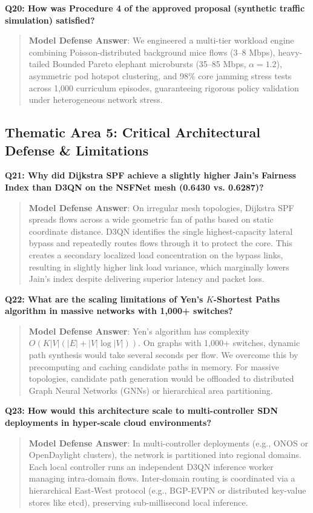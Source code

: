 \noindent\textbf{Q20: How was Procedure 4 of the approved proposal (synthetic traffic simulation) satisfied?}
\begin{quote}
\small
\textbf{Model Defense Answer}: We engineered a multi-tier workload engine combining Poisson-distributed background mice flows (3--8 Mbps), heavy-tailed Bounded Pareto elephant microbursts (35--85 Mbps, $\alpha=1.2$), asymmetric pod hotspot clustering, and 98\% core jamming stress tests across 1,000 curriculum episodes, guaranteeing rigorous policy validation under heterogeneous network stress.
\end{quote}

\subsection{Thematic Area 5: Critical Architectural Defense & Limitations}

\noindent\textbf{Q21: Why did Dijkstra SPF achieve a slightly higher Jain's Fairness Index than D3QN on the NSFNet mesh (0.6430 vs. 0.6287)?}
\begin{quote}
\small
\textbf{Model Defense Answer}: On irregular mesh topologies, Dijkstra SPF spreads flows across a wide geometric fan of paths based on static coordinate distance. D3QN identifies the single highest-capacity lateral bypass and repeatedly routes flows through it to protect the core. This creates a secondary localized load concentration on the bypass links, resulting in slightly higher link load variance, which marginally lowers Jain's index despite delivering superior latency and packet loss.
\end{quote}

\noindent\textbf{Q22: What are the scaling limitations of Yen's $K$-Shortest Paths algorithm in massive networks with 1,000+ switches?}
\begin{quote}
\small
\textbf{Model Defense Answer}: Yen's algorithm has complexity $O(K |V| (|E| + |V| \log |V|))$. On graphs with 1,000+ switches, dynamic path synthesis would take several seconds per flow. We overcome this by precomputing and caching candidate paths in memory. For massive topologies, candidate path generation would be offloaded to distributed Graph Neural Networks (GNNs) or hierarchical area partitioning.
\end{quote}

\noindent\textbf{Q23: How would this architecture scale to multi-controller SDN deployments in hyper-scale cloud environments?}
\begin{quote}
\small
\textbf{Model Defense Answer}: In multi-controller deployments (e.g., ONOS or OpenDaylight clusters), the network is partitioned into regional domains. Each local controller runs an independent D3QN inference worker managing intra-domain flows. Inter-domain routing is coordinated via a hierarchical East-West protocol (e.g., BGP-EVPN or distributed key-value stores like etcd), preserving sub-millisecond local inference.
\end{quote}

